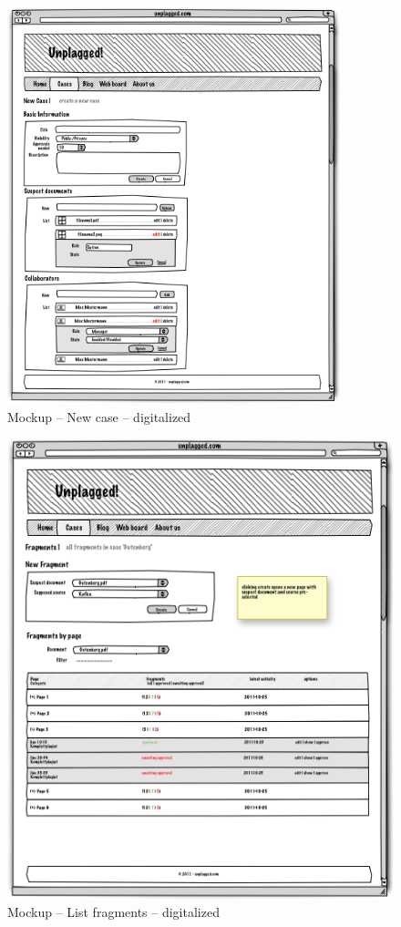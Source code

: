 \begin{appendix}
\begin{figure}[htbp]
  \centering
    \includegraphics[width=0.86\textwidth]{mockups/1_new_case.png}
  \caption{Mockup – New case – digitalized }
  \label{fig:1newCaseMockup}
\end{figure}

\begin{figure}[!h]
  \centering
    \includegraphics[width=\textwidth]{mockups/2_list_fragments.png}
  \caption{Mockup – List fragments – digitalized }
  \label{fig:2listFragmentsMockup}
\end{figure}


\end{appendix}
